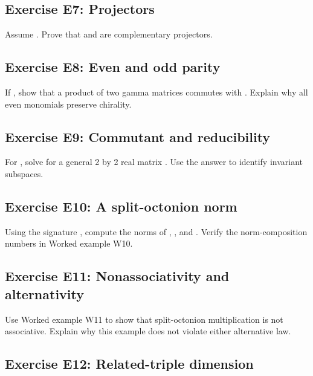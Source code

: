 \documentclass[11pt]{article}
\begin{document}
\subsection{Exercise E7: Projectors}

Assume \texttt{}. Prove that \texttt{} and \texttt{} are complementary projectors.

\subsection{Exercise E8: Even and odd parity}

If \texttt{}, show that a product of two gamma matrices commutes with \texttt{}. Explain why all even monomials preserve chirality.

\subsection{Exercise E9: Commutant and reducibility}

For \texttt{}, solve \texttt{} for a general 2 by 2 real matrix \texttt{}. Use the answer to identify invariant subspaces.

\subsection{Exercise E10: A split-octonion norm}

Using the signature \texttt{}, compute the norms of \texttt{}, \texttt{}, and \texttt{}. Verify the norm-composition numbers in Worked example W10.

\subsection{Exercise E11: Nonassociativity and alternativity}

Use Worked example W11 to show that split-octonion multiplication is not associative. Explain why this example does not violate either alternative law.

\subsection{Exercise E12: Related-triple dimension}
\end{document}
